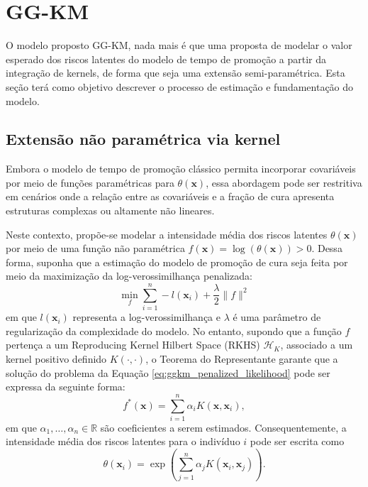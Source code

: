 \section{GG-KM}

O modelo proposto GG-KM, nada mais é que uma proposta de modelar o valor esperado dos riscos latentes do
modelo de tempo de promoção a partir da integração de kernels, de forma que seja uma extensão semi-paramétrica.
Esta seção terá como objetivo descrever o processo de estimação e fundamentação do modelo.

\subsection{Extensão não paramétrica via kernel}

Embora o modelo de tempo de promoção clássico permita incorporar covariáveis por meio de funções paramétricas
para $\theta(\mathbf{x})$, essa abordagem pode ser restritiva em cenários onde a relação entre as covariáveis
e a fração de cura apresenta estruturas complexas ou altamente não lineares.

Neste contexto, propõe-se modelar a intensidade média dos riscos latentes $\theta\left(\mathbf{x}\right)$ por
meio de uma função não paramétrica $f\left(\mathbf{x}\right) = \log\left(\theta\left(\mathbf{x}\right)\right)>0$.
Dessa forma, suponha que a estimação do modelo de promoção de cura seja feita por meio da maximização da log-verossimilhança
penalizada:
\begin{equation}
\label{eq:ggkm_penalized_likelihood}
\min_{f} \sum_{i=1}^n - l(\mathbf{x}_i) + \frac{\lambda}{2} \|f\|^2
\end{equation}
em que $l(\mathbf{x}_i)$ representa a log-verossimilhança e $\lambda$ é uma parâmetro de regularização da complexidade
do modelo. No entanto, supondo que a função $f$ pertença a um Reproducing Kernel Hilbert Space (RKHS)
$\mathcal{H}_K$, associado a um kernel positivo definido $K(\cdot,\cdot)$, o Teorema do Representante
garante que a solução do problema da Equação \ref{eq:ggkm_penalized_likelihood} pode ser expressa da
seguinte forma:
\begin{equation}
f^*(\mathbf{x}) = \sum_{i=1}^{n}\alpha_i K(\mathbf{x},\mathbf{x}_i),
\end{equation}
em que $\alpha_1,\ldots,\alpha_n \in \mathbb{R}$ são coeficientes a serem estimados. Consequentemente, a
intensidade média dos riscos latentes para o indivíduo $i$ pode ser escrita como
\begin{equation}
\theta(\mathbf{x}_i) = \exp\left(\sum_{j=1}^{n}\alpha_j K(\mathbf{x}_i,\mathbf{x}_j)\right).
\end{equation}

